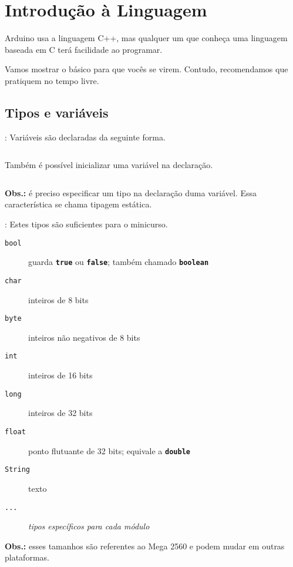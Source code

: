 \section{Introdução à Linguagem}


\begin{frame}{\insertsection}
  Arduino usa a linguagem C++, mas qualquer um que conheça uma linguagem baseada em C terá facilidade ao programar. \medskip

  Vamos mostrar o básico para que vocês se virem. Contudo, recomendamos que pratiquem no tempo livre.

\end{frame}


\subsection{Tipos e variáveis}


\begin{frame}[b]{\insertsection: \insertsubsection}
  Variáveis são declaradas da seguinte forma.
  \inputminted[firstline=1,lastline=1]{arduino}{sketches/introLinguagem/variaveis.ino}

  Também é possível inicializar uma variável na declaração.
  \inputminted[firstline=2,lastline=2]{arduino}{fsketches/introLinguagem/variaveis.ino}

  \vfill
  \textbf{Obs.:} é preciso especificar um tipo na declaração duma variável. Essa característica se chama tipagem estática.\smallskip\\
\end{frame}


\begin{frame}{\insertsection: \insertsubsection}
  Estes tipos são suficientes para o minicurso.

  \begin{description}
    \item[\texttt{bool}] guarda \textbf{\texttt{true}} ou \textbf{\texttt{false}}; também chamado \textbf{\texttt{\textcolor{CustomOrange}{boolean}}}
    \item[\texttt{char}] inteiros de 8 bits
    \item[\texttt{byte}] inteiros não negativos de 8 bits
    \item[\texttt{int}] inteiros de 16 bits
    \item[\texttt{long}] inteiros de 32 bits
    \item[\texttt{float}] ponto flutuante de 32 bits; equivale a \textbf{\texttt{\textcolor{CustomOrange}{double}}}
    \item[\texttt{String}] texto
    \item[\texttt{...}] \textit{tipos específicos para cada módulo}
  \end{description}

  \vfill
  \textbf{Obs.:} esses tamanhos são referentes ao Mega 2560 e podem mudar em outras plataformas.
\end{frame}


